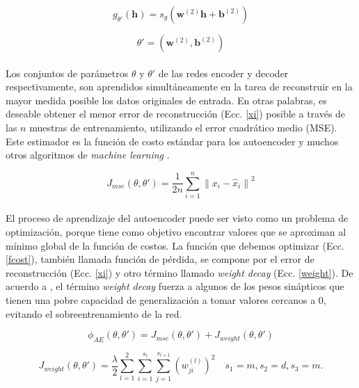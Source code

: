 \documentclass[12pt]{article}%
\begin{document}
\begin{equation}
\label{g}
g_{\theta'}(\textbf{h})=s_{g}(\textbf{w}^{(2)}\textbf{h}+\textbf{b}^{(2)})
\end{equation}

\begin{equation}
\label{teta2}
\theta'=(\textbf{w}^{(2)},\textbf{b}^{(2)})
\end{equation}

\paragraph{}
Los conjuntos de parámetros $\theta$ y $\theta'$ de las redes encoder y decoder respectivamente, son aprendidos simultáneamente en la tarea de reconstruir en la mayor medida posible los datos originales de entrada. En otras palabras, es deseable obtener el menor error de reconstrucción (Ecc. \ref{xi}) posible a través de las $n$ muestras de entrenamiento, utilizando el error cuadrático medio (MSE). Este estimador es la función de costo estándar para los autoencoder y muchos otros algoritmos de \textit{machine learning} \cite{mining}.

\begin{equation}
\label{xi}
J_{mse}(\theta,\theta')=\frac{1}{2n}\sum_{i=1}^{n}{\|x_{i}-\hat{x}_{i}\|}^2
\end{equation}

\paragraph{}
El proceso de aprendizaje del autoencoder puede ser visto como un problema de optimización, porque tiene como objetivo encontrar valores que se aproximan al mínimo global de la función de costos. La función que debemos optimizar (Ecc. \ref{fcost}), también llamada función de pérdida, se compone por el error de reconstrucción (Ecc. \ref{xi}) y otro término llamado \textit{weight decay} (Ecc. \ref{weight}). De acuerdo a \cite{haykin}, el término \textit{weight decay} fuerza a algunos de los pesos sinápticos que tienen una pobre capacidad de generalización a tomar valores cercanos a 0,  evitando el sobreentrenamiento de la red.

\begin{equation}
\label{fcost}
\phi_{AE}(\theta,\theta')= J_{mse}(\theta,\theta') + J_{weight}(\theta,\theta')
\end{equation} 

\begin{equation}
\label{weight}
J_{weight}(\theta,\theta')=\frac{\lambda}{2}\sum_{l=1}^{2}\sum_{i=1}^{s_l}\sum_{j=1}^{s_{l+1}}({w^{(l)}_{ji}})^2 \quad s_{1}=m,s_{2}=d,s_{3}=m.
\end{equation}
\end{document}
